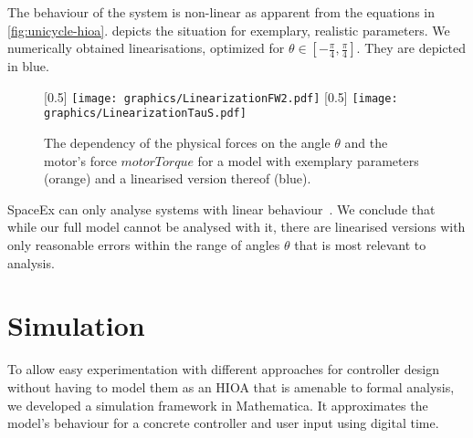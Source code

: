 \documentclass[copyright,submission]{eptcs}
\newcommand{\mi}[1]{\mathit{#1}}
\begin{document}
The behaviour of the system is non-linear as apparent from the equations in \cref{fig:unicycle-hioa}.  depicts the situation for exemplary, realistic parameters. We numerically obtained linearisations, optimized for $\theta \in [-\frac{\pi}{4}, \frac{\pi}{4}]$. They are depicted in blue.

\begin{figure}
    [0.5\linewidth]{
        \centering\texttt{[image: graphics/LinearizationFW2.pdf]}
    }[0.5\linewidth]{
        \centering\texttt{[image: graphics/LinearizationTauS.pdf]}
    }
    \caption{\label{fig:linearization} The dependency of the physical forces on the angle $\theta$ and the motor's force $\mi{motorTorque}$ for a model with exemplary parameters (orange) and a linearised version thereof (blue).}
\end{figure}

SpaceEx can only analyse systems with linear behaviour~\cite{DBLP:conf/cav/FrehseGDCRLRGDM11}. We conclude that while our full model cannot be analysed with it, there are linearised versions with only reasonable errors within the range of angles $\theta$ that is most relevant to analysis.


\section{Simulation}\label{sect:simulation}

To allow easy experimentation with different approaches for controller design without having to model them as an HIOA that is amenable to formal analysis, we developed a simulation framework in Mathematica. It approximates the model's behaviour for a concrete controller and user input using digital time.
\end{document}

